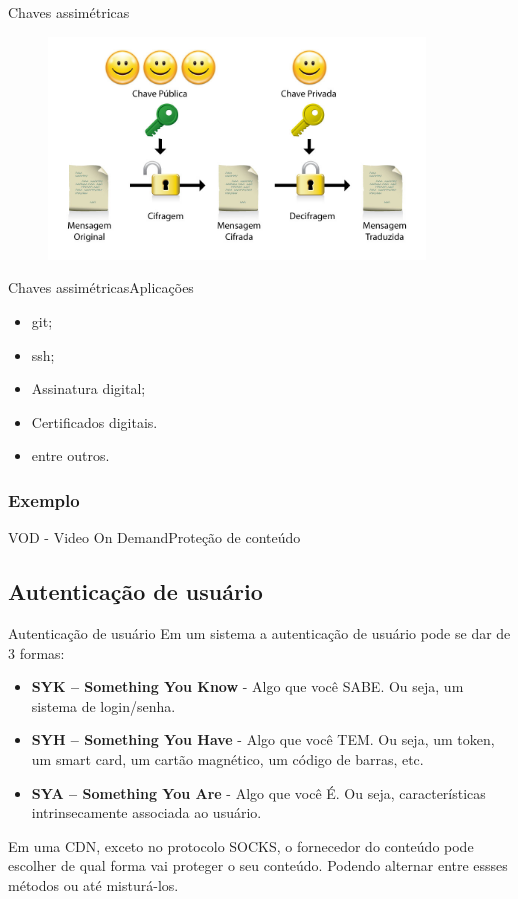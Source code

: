 \documentclass{beamer}
\begin{document}
\begin{frame}{Chaves assim\'etricas}
\begin{figure} 
\includegraphics[width=10cm]{Figuras/criptografia_assimetrica.png} 
\label{figura:criptografia_assimetrica} 
\end{figure}
\end{frame}
\begin{frame}{Chaves assim\'etricas}{Aplica\c{c}\~oes}
\begin{itemize}
\item git;
\item ssh;
\item Assinatura digital;
\item Certificados digitais.
\item entre outros.
\end{itemize}
\end{frame}
\subsubsection{Exemplo}
\begin{frame}{VOD - Video On Demand}{Prote\c{c}\~ao de conte\'udo}
\end{frame}
\subsection{Autentica\c{c}\~ao de usu\'ario}
\begin{frame}{Autentica\c{c}\~ao de usu\'ario}
Em um sistema a autentica\c{c}\~ao de usu\'ario pode se dar de 3 formas:
\begin{itemize}
\item \textbf{SYK – Something You Know} - Algo que voc\^e SABE. Ou seja, um sistema de login/senha.
\item \textbf{SYH – Something You Have} - Algo que voc\^e TEM. Ou seja, um token, um smart card, um cart\~ao magn\'etico, um c\'odigo de barras, etc.
\item \textbf{SYA – Something You Are} - Algo que voc\^e \'E. Ou seja, caracter\'isticas intrinsecamente associada ao usu\'ario.
\end{itemize}
Em uma CDN, exceto no protocolo SOCKS, o fornecedor do conte\'udo pode escolher de qual forma vai proteger o seu conte\'udo. Podendo alternar entre essses m\'etodos ou at\'e mistur\'a-los.
\end{frame}
\end{document}
